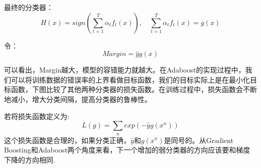\documentclass[UTF8]{ctexart} %
\begin{document}
			最终的分类器：
			\[H(x) = sign(\sum_{t=1}^T\alpha_tf_t(x)),\quad\sum_{t=1}^T\alpha_tf_t(x) = g(x)\]	
			
			令：
			\[Margin=\hat{y}g(x)\]
			
			可以看出，Margin越大，模型的容错能力就越大。在Adaboost的实现过程中，我们可以将训练数据的错误率的上界看做目标函数，我们的目标实际上是在最小化目标函数，下图比较了其他两种分类器的损失函数。在训练过程中，损失函数会不断地减小，增大分类间隔，提高分类器的鲁棒性。
			\begin{figure}[H]
			\end{figure}
			
			若将损失函数定义为:
			\[L(g) = \sum_nexp(-\hat{y}g(x^n))\]
			这个损失函数是合理的，如果分类正确，$\hat{y}$和$g(x^n)$是同号的。从Gradient Boosting和Adaboost两个角度来看，下一个增加的弱分类器的方向应该要和梯度下降的方向相同.
			\begin{figure}[H]
			\end{figure}
			
\end{document}
